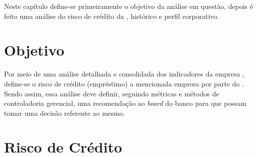 Neste capítulo define-se primeiramente o objetivo da análise em questão, depois é feito uma análise do risco de crédito da \nomeCompletoPositivo{}, histórico e perfil corporativo. 

\section{Objetivo}

Por meio de uma análise detalhada e consolidada dos indicadores da empresa \nomeCompletoPositivo{}, define-se o risco de crédito (empréstimo) a mencionada empresa por parte do \emph{\nomeDoBanco{}}. Sendo assim, essa análise deve definir, seguindo métricas e métodos de controladoria gerencial, uma recomendação ao \emph{board} do banco para que possam tomar uma decisão referente ao mesmo.

\section{Risco de Crédito}
\label{sec:risco}




